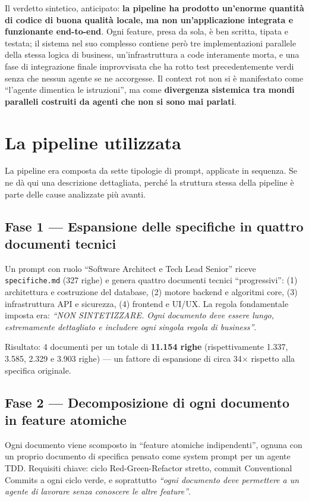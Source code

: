 \documentclass[11pt,a4paper]{article}
\newcommand{\file}[1]{\texttt{\small #1}}
\begin{document}
Il verdetto sintetico, anticipato: \textbf{la pipeline ha prodotto un'enorme quantit\`a di codice di buona qualit\`a locale, ma non un'applicazione integrata e funzionante end-to-end}. Ogni feature, presa da sola, \`e ben scritta, tipata e testata; il sistema nel suo complesso contiene per\`o tre implementazioni parallele della stessa logica di business, un'infrastruttura a code interamente morta, e una fase di integrazione finale improvvisata che ha rotto test precedentemente verdi senza che nessun agente se ne accorgesse. Il context rot non si \`e manifestato come ``l'agente dimentica le istruzioni'', ma come \textbf{divergenza sistemica tra mondi paralleli costruiti da agenti che non si sono mai parlati}.

\section{La pipeline utilizzata}

La pipeline era composta da sette tipologie di prompt, applicate in sequenza. Se ne d\`a qui una descrizione dettagliata, perch\'e la struttura stessa della pipeline \`e parte delle cause analizzate pi\`u avanti.

\subsection{Fase 1 --- Espansione delle specifiche in quattro documenti tecnici}
Un prompt con ruolo ``Software Architect e Tech Lead Senior'' riceve \file{specifiche.md} (327 righe) e genera quattro documenti tecnici ``progressivi'': (1) architettura e costruzione del database, (2) motore backend e algoritmi core, (3) infrastruttura API e sicurezza, (4) frontend e UI/UX. La regola fondamentale imposta era: \emph{``NON SINTETIZZARE. Ogni documento deve essere lungo, estremamente dettagliato e includere ogni singola regola di business''}.

Risultato: 4 documenti per un totale di \textbf{11.154 righe} (rispettivamente 1.337, 3.585, 2.329 e 3.903 righe) --- un fattore di espansione di circa 34$\times$ rispetto alla specifica originale.

\subsection{Fase 2 --- Decomposizione di ogni documento in feature atomiche}
Ogni documento viene scomposto in ``feature atomiche indipendenti'', ognuna con un proprio documento di specifica pensato come system prompt per un agente TDD. Requisiti chiave: ciclo Red-Green-Refactor stretto, commit Conventional Commits a ogni ciclo verde, e soprattutto \emph{``ogni documento deve permettere a un agente di lavorare senza conoscere le altre feature''}.
\end{document}
